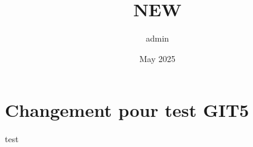 \documentclass{article}
\title{NEW}
\author{admin }
\date{May 2025}
\begin{document}
\maketitle

\section{Changement pour test GIT5}
test
\end{document}
